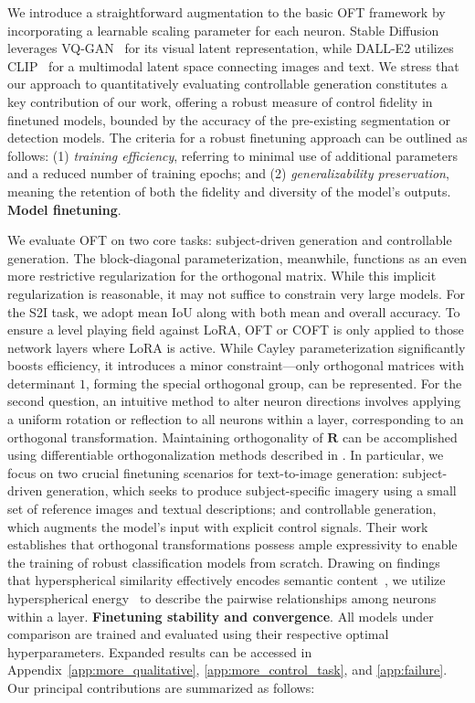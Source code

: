 We introduce a straightforward augmentation to the basic OFT framework by incorporating a learnable scaling parameter for each neuron. Stable Diffusion leverages VQ-GAN~\cite{esser2021taming} for its visual latent representation, while DALL-E2 utilizes CLIP~\cite{radford2021learning} for a multimodal latent space connecting images and text. We stress that our approach to quantitatively evaluating controllable generation constitutes a key contribution of our work, offering a robust measure of control fidelity in finetuned models, bounded by the accuracy of the pre-existing segmentation or detection models. The criteria for a robust finetuning approach can be outlined as follows: (1) \emph{training efficiency}, referring to minimal use of additional parameters and a reduced number of training epochs; and (2) \emph{generalizability preservation}, meaning the retention of both the fidelity and diversity of the model’s outputs. \textbf{Model finetuning}. \item We evaluate OFT on two core tasks: subject-driven generation and controllable generation. The block-diagonal parameterization, meanwhile, functions as an even more restrictive regularization for the orthogonal matrix. While this implicit regularization is reasonable, it may not suffice to constrain very large models. For the S2I task, we adopt mean IoU along with both mean and overall accuracy. To ensure a level playing field against LoRA, OFT or COFT is only applied to those network layers where LoRA is active. While Cayley parameterization significantly boosts efficiency, it introduces a minor constraint—only orthogonal matrices with determinant $1$, forming the special orthogonal group, can be represented. For the second question, an intuitive method to alter neuron directions involves applying a uniform rotation or reflection to all neurons within a layer, corresponding to an orthogonal transformation. Maintaining orthogonality of $\bm{R}$ can be accomplished using differentiable orthogonalization methods described in \cite{liu2021orthogonal,lezcano2019cheap}. In particular, we focus on two crucial finetuning scenarios for text-to-image generation: subject-driven generation, which seeks to produce subject-specific imagery using a small set of reference images and textual descriptions; and controllable generation, which augments the model’s input with explicit control signals. Their work establishes that orthogonal transformations possess ample expressivity to enable the training of robust classification models from scratch. Drawing on findings that hyperspherical similarity effectively encodes semantic content~\cite{liu2017deep,liu2018decoupled,chen2020angular}, we utilize hyperspherical energy~\cite{liu2018learning} to describe the pairwise relationships among neurons within a layer. \textbf{Finetuning stability and convergence}. All models under comparison are trained and evaluated using their respective optimal hyperparameters. Expanded results can be accessed in Appendix~\ref{app:more_qualitative}, \ref{app:more_control_task}, and \ref{app:failure}. Our principal contributions are summarized as follows:

